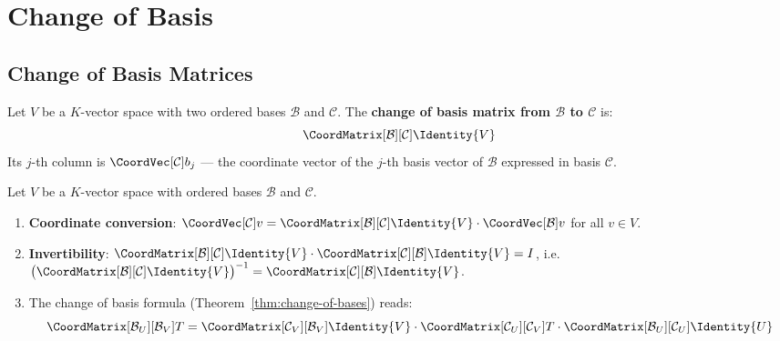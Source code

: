
\newpage
\section{Change of Basis}
\label{sec:change-of-basis}

\subsection{Change of Basis Matrices}

\begin{definition}
\label{def:cob-matrix}
    Let $V$ be a $K$-vector space with two ordered bases $\mathcal{B}$ and $\mathcal{C}$.
    The \textbf{change of basis matrix from $\mathcal{B}$ to $\mathcal{C}$} is:
    \[
        \CoordMatrix[\mathcal{B}][\mathcal{C}]{\Identity{V}}
    \]
    Its $j$-th column is $\CoordVec[\mathcal{C}]{b_j}$ --- the coordinate vector of the
    $j$-th basis vector of $\mathcal{B}$ expressed in basis $\mathcal{C}$.
\end{definition}

\begin{proposition}
\label{prop:cob-properties}
    Let $V$ be a $K$-vector space with ordered bases $\mathcal{B}$ and $\mathcal{C}$.
    \begin{enumerate}
        \item \textbf{Coordinate conversion}:
              $\CoordVec[\mathcal{C}]{v}
              = \CoordMatrix[\mathcal{B}][\mathcal{C}]{\Identity{V}}
                \cdot \CoordVec[\mathcal{B}]{v}$
              for all $v \in V$.
        \item \textbf{Invertibility}:
              $\CoordMatrix[\mathcal{B}][\mathcal{C}]{\Identity{V}}
               \cdot \CoordMatrix[\mathcal{C}][\mathcal{B}]{\Identity{V}} = I$,
               i.e.\
              $\bigl(\CoordMatrix[\mathcal{B}][\mathcal{C}]{\Identity{V}}\bigr)^{-1}
              = \CoordMatrix[\mathcal{C}][\mathcal{B}]{\Identity{V}}$.
        \item The change of basis formula (Theorem~\ref{thm:change-of-bases}) reads:
              \[
                  \CoordMatrix[\mathcal{B}_U][\mathcal{B}_V]{T}
                  = \CoordMatrix[\mathcal{C}_V][\mathcal{B}_V]{\Identity{V}}
                    \cdot \CoordMatrix[\mathcal{C}_U][\mathcal{C}_V]{T}
                    \cdot \CoordMatrix[\mathcal{B}_U][\mathcal{C}_U]{\Identity{U}}
              \]
    \end{enumerate}
\end{proposition}

